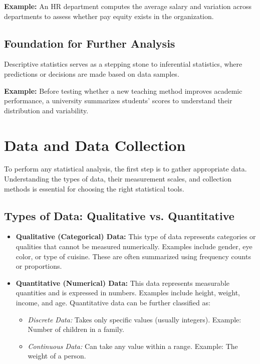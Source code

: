 \textbf{Example:} An HR department computes the average salary and variation across departments to assess whether pay equity exists in the organization.

\subsection{Foundation for Further Analysis}

Descriptive statistics serves as a stepping stone to inferential statistics, where predictions or decisions are made based on data samples.

\textbf{Example:} Before testing whether a new teaching method improves academic performance, a university summarizes students' scores to understand their distribution and variability.

\section{Data and Data Collection}

To perform any statistical analysis, the first step is to gather appropriate data. Understanding the types of data, their measurement scales, and collection methods is essential for choosing the right statistical tools.

\subsection{Types of Data: Qualitative vs. Quantitative}

\begin{itemize}
    \item \textbf{Qualitative (Categorical) Data:} This type of data represents categories or qualities that cannot be measured numerically. Examples include gender, eye color, or type of cuisine. These are often summarized using frequency counts or proportions.

    \item \textbf{Quantitative (Numerical) Data:} This data represents measurable quantities and is expressed in numbers. Examples include height, weight, income, and age. Quantitative data can be further classified as:
    \begin{itemize}
        \item \textit{Discrete Data:} Takes only specific values (usually integers). Example: Number of children in a family.
        \item \textit{Continuous Data:} Can take any value within a range. Example: The weight of a person.
    \end{itemize}
\end{itemize}


